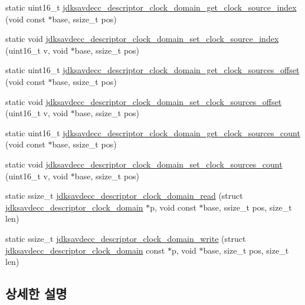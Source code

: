 \begin{DoxyCompactItemize}
static uint16\+\_\+t \hyperlink{group__descriptor__clock__domain_ga6a4c7b063da71aff1fe21915bd739d5e}{jdksavdecc\+\_\+descriptor\+\_\+clock\+\_\+domain\+\_\+get\+\_\+clock\+\_\+source\+\_\+index} (void const $\ast$base, ssize\+\_\+t pos)
\item 
static void \hyperlink{group__descriptor__clock__domain_ga9779a3f76622d37697677fdfc988dfe9}{jdksavdecc\+\_\+descriptor\+\_\+clock\+\_\+domain\+\_\+set\+\_\+clock\+\_\+source\+\_\+index} (uint16\+\_\+t v, void $\ast$base, ssize\+\_\+t pos)
\item 
static uint16\+\_\+t \hyperlink{group__descriptor__clock__domain_ga94e7b9934982cdf00b93bb6ad8942920}{jdksavdecc\+\_\+descriptor\+\_\+clock\+\_\+domain\+\_\+get\+\_\+clock\+\_\+sources\+\_\+offset} (void const $\ast$base, ssize\+\_\+t pos)
\item 
static void \hyperlink{group__descriptor__clock__domain_gab5b725c7078ed415455913e312694136}{jdksavdecc\+\_\+descriptor\+\_\+clock\+\_\+domain\+\_\+set\+\_\+clock\+\_\+sources\+\_\+offset} (uint16\+\_\+t v, void $\ast$base, ssize\+\_\+t pos)
\item 
static uint16\+\_\+t \hyperlink{group__descriptor__clock__domain_gab452e3985705f9a639b2557a752186f8}{jdksavdecc\+\_\+descriptor\+\_\+clock\+\_\+domain\+\_\+get\+\_\+clock\+\_\+sources\+\_\+count} (void const $\ast$base, ssize\+\_\+t pos)
\item 
static void \hyperlink{group__descriptor__clock__domain_gac516bc5b6467d0f8583def073988e2ad}{jdksavdecc\+\_\+descriptor\+\_\+clock\+\_\+domain\+\_\+set\+\_\+clock\+\_\+sources\+\_\+count} (uint16\+\_\+t v, void $\ast$base, ssize\+\_\+t pos)
\item 
static ssize\+\_\+t \hyperlink{group__descriptor__clock__domain_ga0b62395015f26229fdcbb96fc7552a5a}{jdksavdecc\+\_\+descriptor\+\_\+clock\+\_\+domain\+\_\+read} (struct \hyperlink{structjdksavdecc__descriptor__clock__domain}{jdksavdecc\+\_\+descriptor\+\_\+clock\+\_\+domain} $\ast$p, void const $\ast$base, ssize\+\_\+t pos, size\+\_\+t len)
\item 
static ssize\+\_\+t \hyperlink{group__descriptor__clock__domain_gaea18c7c09a894ddadbb40d2402205b40}{jdksavdecc\+\_\+descriptor\+\_\+clock\+\_\+domain\+\_\+write} (struct \hyperlink{structjdksavdecc__descriptor__clock__domain}{jdksavdecc\+\_\+descriptor\+\_\+clock\+\_\+domain} const $\ast$p, void $\ast$base, size\+\_\+t pos, size\+\_\+t len)
\end{DoxyCompactItemize}


\subsection{상세한 설명}


